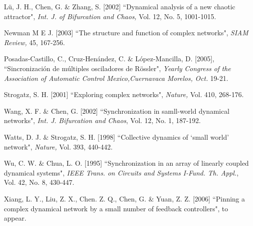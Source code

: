 \documentclass[11pt]{article}
\begin{document}
\begin{thebibliography}{10}
 { L\"{u}, J. H., Chen, G. $\&$ Zhang, S. [2002]
``Dynamical analysis of a new chaotic attractor",  {\it Int. J. of
Bifurcation and Chaos,} Vol. 12, No. 5, 1001-1015.}

 { Newman M E J. [2003]
``The structure and function of complex networks",  {\it SIAM
Review,} 45, 167-256.}

 {Posadas-Castillo, C., Cruz-Hen\'{a}ndez, C. $\&$ L\'{o}pez-Mancilla, D. [2005],
``Sincronizaci\'{o}n de m\'{u}ltiples osciladores de R\"{o}ssler",
{\it Yearly Congress of the Association of Automatic Control
Mexico,Cuernavaca Morelos, Oct. } 19-21. }

 { Strogatz, S. H. [2001] ``Exploring complex networks",
{\it Nature,} Vol. 410, 268-176.}

 { Wang, X. F. $\&$  Chen, G. [2002]
``Synchronization in samll-world dynamical networks", {\it Int. J.
Bifurcation and Chaos}, Vol. 12, No. 1, 187-192.}

 { Watts, D. J. $\&$ Strogatz, S. H. [1998] ``Collective dynamics of `small world' network",
{\it Nature,} Vol. 393, 440-442.}

 { Wu, C. W. $\&$  Chua, L. O. [1995]
``Synchronization in an array of linearly coupled dynamical
systems", {\it IEEE Trans. on Circuits and Systems I-Fund. Th.
Appl.}, Vol. 42, No. 8, 430-447.}

 { Xiang, L. Y., Liu, Z. X., Chen. Z. Q., Chen, G. $\&$  Yuan, Z. Z. [2006]
``Pinning a complex dynamical network by a small number of feedback
controllers", to appear.}




\end{thebibliography}
\end{document}
